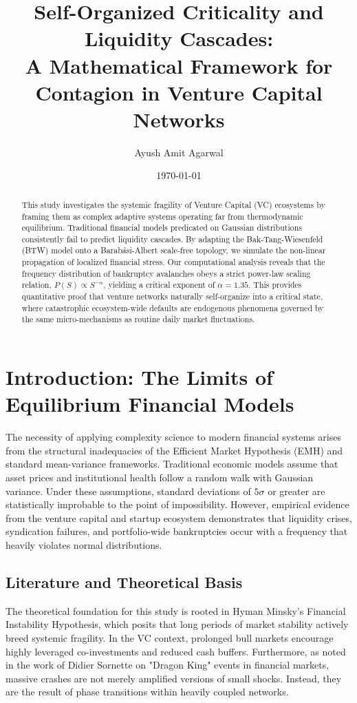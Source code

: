 \documentclass[12pt, a4paper, titlepage]{article}
\title{Self-Organized Criticality and Liquidity Cascades:\\ A Mathematical Framework for Contagion in Venture Capital Networks}
\author{Ayush Amit Agarwal}
\affil{Department of Chemical Engineering, Indian Institute of Technology, Delhi \\ Entry Number: 2021CH70436}
\date{\today}
\begin{document}
\maketitle

\begin{abstract}
This study investigates the systemic fragility of Venture Capital (VC) ecosystems by framing them as complex adaptive systems operating far from thermodynamic equilibrium. Traditional financial models predicated on Gaussian distributions consistently fail to predict liquidity cascades. By adapting the Bak-Tang-Wiesenfeld (BTW) model onto a Barab\'asi-Albert scale-free topology, we simulate the non-linear propagation of localized financial stress. Our computational analysis reveals that the frequency distribution of bankruptcy avalanches obeys a strict power-law scaling relation, $P(S) \propto S^{-\alpha}$, yielding a critical exponent of $\alpha = 1.35$. This provides quantitative proof that venture networks naturally self-organize into a critical state, where catastrophic ecosystem-wide defaults are endogenous phenomena governed by the same micro-mechanisms as routine daily market fluctuations.
\end{abstract}

\section{Introduction: The Limits of Equilibrium Financial Models}
The necessity of applying complexity science to modern financial systems arises from the structural inadequacies of the Efficient Market Hypothesis (EMH) and standard mean-variance frameworks. Traditional economic models assume that asset prices and institutional health follow a random walk with Gaussian variance. Under these assumptions, standard deviations of $5\sigma$ or greater are statistically improbable to the point of impossibility. However, empirical evidence from the venture capital and startup ecosystem demonstrates that liquidity crises, syndication failures, and portfolio-wide bankruptcies occur with a frequency that heavily violates normal distributions. 

\subsection{Literature and Theoretical Basis}
The theoretical foundation for this study is rooted in Hyman Minsky's Financial Instability Hypothesis, which posits that long periods of market stability actively breed systemic fragility. In the VC context, prolonged bull markets encourage highly leveraged co-investments and reduced cash buffers. Furthermore, as noted in the work of Didier Sornette on "Dragon King" events in financial markets, massive crashes are not merely amplified versions of small shocks. Instead, they are the result of phase transitions within heavily coupled networks.
\end{document}
